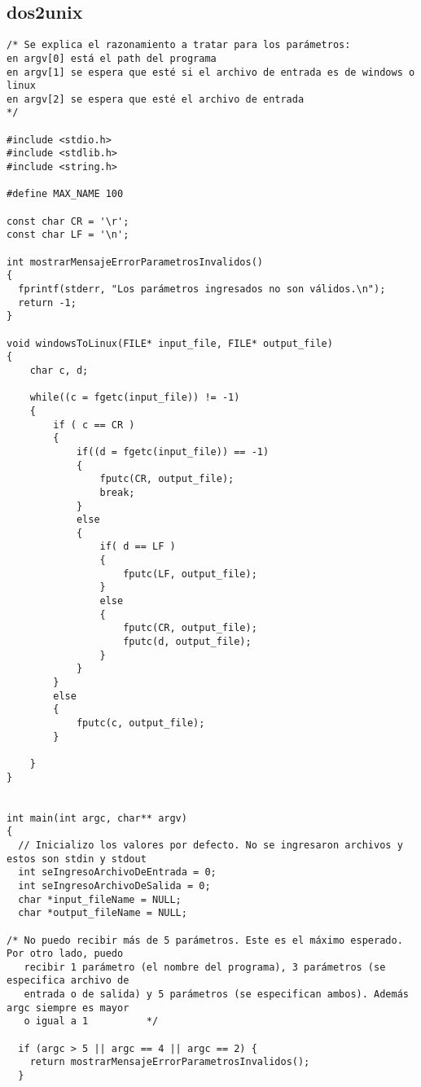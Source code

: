 \documentclass[a4paper,11pt]{article}
\begin{document}
\subsection{dos2unix}
\begin{verbatim}
/* Se explica el razonamiento a tratar para los parámetros:
en argv[0] está el path del programa
en argv[1] se espera que esté si el archivo de entrada es de windows o linux
en argv[2] se espera que esté el archivo de entrada
*/

#include <stdio.h>
#include <stdlib.h>
#include <string.h>

#define MAX_NAME 100

const char CR = '\r';
const char LF = '\n';

int mostrarMensajeErrorParametrosInvalidos()
{
  fprintf(stderr, "Los parámetros ingresados no son válidos.\n");
  return -1;
}

void windowsToLinux(FILE* input_file, FILE* output_file)
{
	char c, d;

	while((c = fgetc(input_file)) != -1)
	{
		if ( c == CR )
		{
      		if((d = fgetc(input_file)) == -1)
      		{
        		fputc(CR, output_file);
        		break;
      		}
      		else
      		{
        		if( d == LF )
        		{
          			fputc(LF, output_file);
        		}
		        else
		        {
		          	fputc(CR, output_file);
		          	fputc(d, output_file);
		        }
      		}
    	}
    	else
    	{
      		fputc(c, output_file);
    	}

	}
}


int main(int argc, char** argv)
{
  // Inicializo los valores por defecto. No se ingresaron archivos y estos son stdin y stdout
  int seIngresoArchivoDeEntrada = 0;
  int seIngresoArchivoDeSalida = 0;
  char *input_fileName = NULL;
  char *output_fileName = NULL;

/* No puedo recibir más de 5 parámetros. Este es el máximo esperado. Por otro lado, puedo
   recibir 1 parámetro (el nombre del programa), 3 parámetros (se especifica archivo de 
   entrada o de salida) y 5 parámetros (se especifican ambos). Además argc siempre es mayor
   o igual a 1          */

  if (argc > 5 || argc == 4 || argc == 2) {
    return mostrarMensajeErrorParametrosInvalidos();
  }


\end{verbatim}
\end{document}
